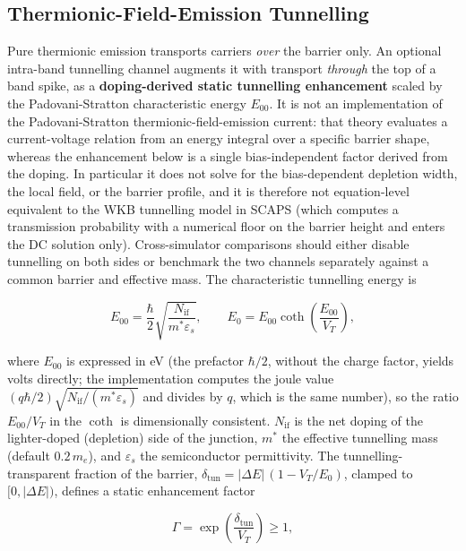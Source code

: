 \documentclass[
  11pt,
  american,
]{report}
\begin{document}
\hypertarget{thermionic-field-emission-tunnelling}{%
\subsection{Thermionic-Field-Emission
Tunnelling}\label{thermionic-field-emission-tunnelling}}

Pure thermionic emission transports carriers \emph{over} the barrier
only. An optional intra-band tunnelling channel augments it with
transport \emph{through} the top of a band spike, as a
\textbf{doping-derived static tunnelling enhancement} scaled by the
Padovani-Stratton characteristic energy \(E_{00}\). It is not an
implementation of the Padovani-Stratton thermionic-field-emission
current: that theory evaluates a current-voltage relation from an energy
integral over a specific barrier shape, whereas the enhancement below is
a single bias-independent factor derived from the doping. In particular
it does not solve for the bias-dependent depletion width, the local
field, or the barrier profile, and it is therefore not equation-level
equivalent to the WKB tunnelling model in SCAPS (which computes a
transmission probability with a numerical floor on the barrier height
and enters the DC solution only). Cross-simulator comparisons should
either disable tunnelling on both sides or benchmark the two channels
separately against a common barrier and effective mass. The
characteristic tunnelling energy is

\begin{equation}
\label{eq:tfe-e00}
E_{00} = \frac{\hbar}{2}\sqrt{\frac{N_{\mathrm{if}}}{m^{*}\varepsilon_s}},
\qquad
E_{0} = E_{00}\coth\!\left(\frac{E_{00}}{V_T}\right),
\end{equation}

where \(E_{00}\) is expressed in eV (the prefactor \(\hbar/2\), without
the charge factor, yields volts directly; the implementation computes
the joule value
\((q\hbar/2)\sqrt{N_{\mathrm{if}}/(m^{*}\varepsilon_s)}\) and divides by
\(q\), which is the same number), so the ratio \(E_{00}/V_T\) in the
\(\coth\) is dimensionally consistent. \(N_{\mathrm{if}}\) is the net
doping of the lighter-doped (depletion) side of the junction, \(m^{*}\)
the effective tunnelling mass (default \(0.2\,m_e\)), and
\(\varepsilon_s\) the semiconductor permittivity. The
tunnelling-transparent fraction of the barrier,
\(\delta_{\mathrm{tun}} = |\Delta E|\,(1 - V_T/E_0)\), clamped to
\([0, |\Delta E|)\), defines a static enhancement factor

\begin{equation}
\label{eq:tfe-gamma}
\Gamma = \exp\!\left(\frac{\delta_{\mathrm{tun}}}{V_T}\right) \geq 1,
\end{equation}
\end{document}
